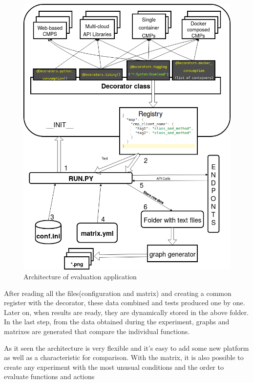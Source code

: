 \begin{figure}[htbp]
\centerline{\includegraphics[scale=0.33]{pics/PA1_Diagram.png}}
\caption{Architecture of evaluation application}
\label{fig}
\end{figure}
After reading all the files(configuration and matrix) and creating a common register with the decorator, these data combined and tests produced one by one. Later on, when results are ready, they are dynamically stored in the above folder. In the last step, from the data obtained during the experiment, graphs and matrixes are generated that compare the individual functions.

As it seen the architecture is very flexible and it's easy to add some new platform as well as a characteristic for comparison. With the matrix, it is also possible to create any experiment with the most unusual conditions and the order to evaluate functions and actions